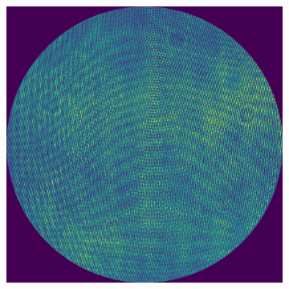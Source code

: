 \begin{figure}
\begin{subfigure}{0.23\textwidth}
		\caption{}
		\label{fig:puw_mask}
	\end{subfigure}
	\begin{subfigure}{0.23\textwidth}
		\centering
		\includegraphics[width=1\linewidth, scale=0.5]{images/puw_data_masked.png}
		\caption{}
		\label{fig:puw_data_masked}
	\end{subfigure}
	

\end{figure}
